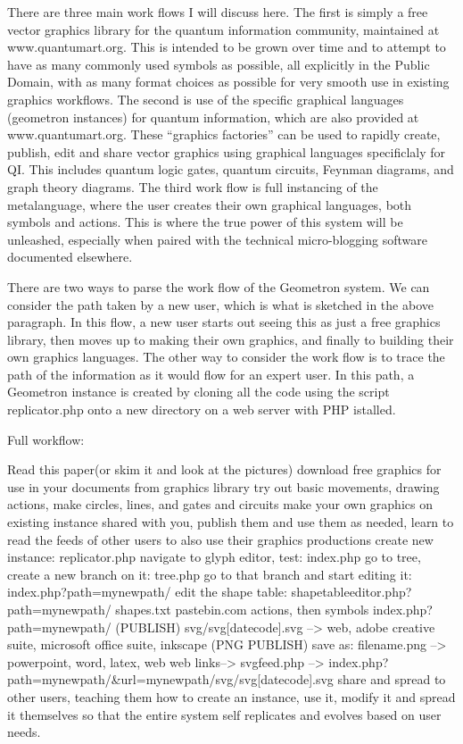 \documentclass[11pt]{article}
\begin{document}
    There are three main work flows I will discuss here.  The first is simply a free vector graphics library for the quantum information community, maintained at www.quantumart.org.  This is intended to be grown over time and to attempt to have as many commonly used symbols as possible, all explicitly in the Public Domain, with as many format choices as possible for very smooth use in existing graphics workflows.  The second is use of the specific graphical languages (geometron instances) for quantum information, which are also provided at www.quantumart.org.  These ``graphics factories'' can be used to rapidly create, publish, edit and share vector graphics using graphical languages specificlaly for QI.  This includes quantum logic gates, quantum circuits, Feynman diagrams, and graph theory diagrams. The third work flow is full instancing of the metalanguage, where the user creates their own graphical languages, both symbols and actions.  This is where the true power of this system will be unleashed, especially when paired with the technical micro-blogging software documented elsewhere.  

There are two ways to parse the work flow of the Geometron system.  We can consider the path taken by a new user, which is what is sketched in the above paragraph.  In this flow, a new user starts out seeing this as just a free graphics library, then moves up to making their own graphics, and finally to building their own graphics languages.  The other way to consider the work flow is to trace the path of the information as it would flow for an expert user.  In this path, a Geometron instance is created by cloning all the code using the script replicator.php onto a new directory on a web server with PHP istalled.  


Full workflow:

Read this paper(or skim it and look at the pictures) 
download free graphics for use in your documents from graphics library
try out basic movements, drawing actions, make circles, lines, and gates and circuits
make your own graphics on existing instance shared with you, publish them and use them as needed, learn to read the feeds of other users to also use their graphics productions
create new instance:
replicator.php
navigate to glyph editor, test:
index.php
go to tree, create a new branch on it:
tree.php
go to that branch and start editing it:
index.php?path=mynewpath/
edit the shape table:
shapetableeditor.php?path=mynewpath/
shapes.txt
pastebin.com 
actions, then symbols
index.php?path=mynewpath/
(PUBLISH)
svg/svg[datecode].svg --> web, adobe creative suite, microsoft office suite, inkscape
(PNG PUBLISH)
save as: filename.png --> powerpoint, word, latex, web
web links--> svgfeed.php --> index.php?path=mynewpath/&url=mynewpath/svg/svg[datecode].svg
share and spread to other users, teaching them how to create an instance, use it, modify it and spread it themselves so that the entire system self replicates and evolves based on user needs.  
\end{document}
